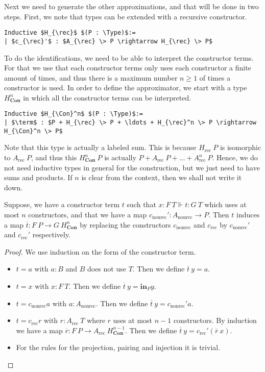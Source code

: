 \documentclass[a4paper,UKenglish]{lipics-v2016}
\newcommand{\Boperator}[1]{\mathrm{\mathbf{#1}}}
\newcommand{\inn}{\Boperator{in}}
\newcommand{\rec}[0]{\operatorname{rec}}
\newcommand{\nonrec}[0]{\operatorname{nonrec}}
\newcommand{\term}[0]{\textbf{term}}
\newcommand{\Con}[0]{\textbf{Con}}
\newcommand{\Type}[0]{\operatorname{\textsc{Type}}}
\begin{document}
Next we need to generate the other approximations, and that will be done in two steps.
First, we note that types can be extended with a recursive constructor.
\lstset{language=Coq}
\begin{lstlisting}
Inductive $H_{\rec}$ $(P : \Type)$:=
| $c_{\rec}'$ : $A_{\rec} \> P \rightarrow H_{\rec} \> P$
\end{lstlisting}
To do the identifications, we need to be able to interpret the constructor terms.
For that we use that each constructor terms only uses each constructor  a finite amount of times, and thus there is a maximum number $n \geq 1$ of times a constructor is used.
In order to define the approximator, we start with a type $H_{\Con}^n$ in which all the constructor terms can be interpreted.
\lstset{language=Coq}
\begin{lstlisting}
Inductive $H_{\Con}^n$ $(P : \Type)$:=
| $\term$ : $P + H_{\rec} \> P + \ldots + H_{\rec}^n \> P \rightarrow H_{\Con}^n \> P$
\end{lstlisting}

Note that this type is actually a labeled sum.
This is because $H_{\rec} \> P$ is isomorphic to $A_{\rec} \> P$, and thus this $H_{\Con}^n \> P$ is actually $P + A_{\rec} \> P + \ldots + A_{\rec}^n \> P$.
Hence, we do not need inductive types in general for the construction, but we just need to have sums and products.
If $n$ is clear from the context, then we shall not write it down.

\begin{lemma}
Suppose, we have a constructor term $t$ such that $x : F \> T \Vdash t : G \>T$ which uses at most $n$ constructors, and that we have a map $c_{\nonrec}' : A_{\nonrec} \rightarrow P$.
Then $t$ induces a map $\overline{t} : F \> P \rightarrow G \> H_{\Con}^n$ by replacing the constructors $c_{\nonrec}$ and $c_{\rec}$ by $c_{\nonrec}'$ and $c_{\rec}'$ respectively.
\end{lemma}

\begin{proof}
We use induction on the form of the constructor term.
\begin{itemize}
	\item $t = a$ with $a : B$ and $B$ does not use $T$. Then we define $\overline{t} \> y = a$.
	\item $t = x$ with $x : F \> T$. Then we define $\overline{t} \> y = \inn_P y$.
	\item $t = c_{\nonrec} a$ with $a : A_{\nonrec}$. Then we define $\overline{t} \> y = c_{\nonrec}' a$.
	\item $t = c_{\rec} r$ with $r : A_{\rec} \> T$ where $r$ uses at most $n-1$ constructors. 
			  By induction we have a map $\overline{r} : F \> P \rightarrow A_{\rec} \> H_{\Con}^{n-1}$.
			  Then we define $\overline{t} \> y = c_{\rec}' (\overline{r} \> x)$.
	\item For the rules for the projection, pairing and injection it is trivial. \qedhere
\end{itemize}
\end{proof}
\end{document}
